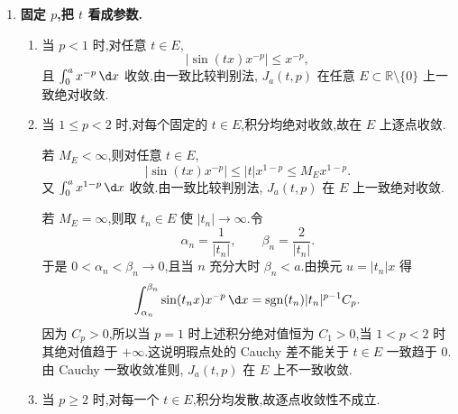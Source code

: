 \begin{example}
\begin{enumerate}
		综上,当 $t\neq0$ 时,
		\begin{gather*}
			\int_0^a \sin(tx)x^{-p}\,\d x
			\begin{cases}
				\text{绝对收敛},&p<2,\\[3pt]
				\text{发散},&p\geq2.
			\end{cases}
		\end{gather*}
		这里没有条件收敛情形,因为在 $0$ 的充分小右邻域内, $\sin(tx)$ 不发生无限振荡抵消.

		\item \textbf{固定 $p$,把 $t$ 看成参数.}

		\begin{enumerate}
			\item 当 $p<1$ 时,对任意 $t\in E$,
			\begin{equation*}
				|\sin(tx)x^{-p}|\leq x^{-p},
			\end{equation*}
			且 $\int_0^a x^{-p}\,\d x$ 收敛.由一致比较判别法, $J_a(t,p)$ 在任意 $E\subset\mathbb R\setminus\{0\}$ 上一致绝对收敛.

			\item 当 $1\leq p<2$ 时,对每个固定的 $t\in E$,积分均绝对收敛,故在 $E$ 上逐点收敛.

			若 $M_E<\infty$,则对任意 $t\in E$,
			\begin{equation*}
				|\sin(tx)x^{-p}|
				\leq |t|x^{1-p}
				\leq M_E x^{1-p}.
			\end{equation*}
			又 $\int_0^a x^{1-p}\,\d x$ 收敛.由一致比较判别法, $J_a(t,p)$ 在 $E$ 上一致绝对收敛.

			若 $M_E=\infty$,则取 $t_n\in E$ 使 $|t_n|\to\infty$.令
			\begin{equation*}
				\alpha_n=\frac1{|t_n|},
				\qquad
				\beta_n=\frac2{|t_n|}.
			\end{equation*}
			于是 $0<\alpha_n<\beta_n\to0$,且当 $n$ 充分大时 $\beta_n<a$.由换元 $u=|t_n|x$ 得
			\begin{equation*}
				\int_{\alpha_n}^{\beta_n}\sin(t_nx)x^{-p}\,\d x
				=
				\operatorname{sgn}(t_n)|t_n|^{p-1}C_p.
			\end{equation*}
			因为 $C_p>0$,所以当 $p=1$ 时上述积分绝对值恒为 $C_1>0$,当 $1<p<2$ 时其绝对值趋于 $+\infty$.这说明瑕点处的 Cauchy 差不能关于 $t\in E$ 一致趋于 $0$.由 Cauchy 一致收敛准则, $J_a(t,p)$ 在 $E$ 上不一致收敛.

			\item 当 $p\geq2$ 时,对每一个 $t\in E$,积分均发散,故逐点收敛性不成立.
		\end{enumerate}


\end{enumerate}
\end{example}
